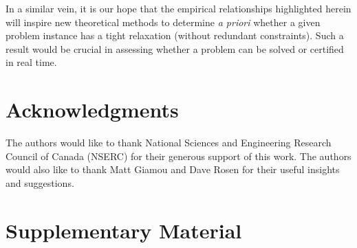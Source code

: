 \documentclass[lettersize,journal]{IEEEtran}
\newcommand{\rev}[1]{\color{red}{#1}\color{black}}
\begin{document}
In a similar vein, it is our hope that the empirical relationships highlighted herein will inspire new theoretical methods to determine \emph{a priori} whether a given problem instance has a tight relaxation (without redundant constraints)\cite{carloneEstimationContractsOutlierRobust2022}. Such a result would be crucial in assessing whether a problem can be solved or certified in real time. 

\section{Acknowledgments}

The authors would like to thank National Sciences and Engineering Research Council of Canada (NSERC) for their generous support of this work. The authors would also like to thank Matt Giamou and Dave Rosen for their useful insights and suggestions.
 



\section{Supplementary Material}
\end{document}
